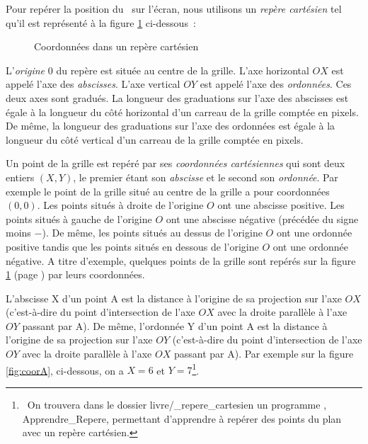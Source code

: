 Pour repérer la position du \robot\ sur l'écran, nous utilisons un {\em repère cartésien}
tel qu'il est représenté à la figure \ref{fig:repcar} ci-dessous~:

\begin{figure}[htbp]
 \caption{Coordonnées dans un repère cartésien}\label{fig:repcar}
\end{figure}

L'{\em origine\/} $0$ du repère est située au centre de la grille. L'axe horizontal $OX$ est 
appelé l'axe des {\em abscisses\/}. L'axe vertical $OY$ est 
appelé l'axe des {\em ordonnées\/}. Ces deux axes sont gradués. La longueur des
graduations sur l'axe des abscisses est égale à la longueur du côté horizontal d'un carreau 
 de la grille comptée en pixels. De même, la longueur des
graduations sur l'axe des ordonnées est égale à la longueur du côté vertical d'un carreau
de la grille comptée en pixels. 

Un point de la grille est repéré par ses {\em  coordonnées cartésiennes} qui sont
deux entiers $(X, Y)$, le premier étant son {\em abscisse} et le second son {\em ordonnée}. Par exemple le 
point de la grille situé au centre de la grille a pour coordonnées $(0, 0)$. Les points situés
à droite de l'origine $O$ ont une abscisse positive. Les points situés
à gauche de l'origine $O$ ont une abscisse négative (précédée du signe moins $-$). 
De même, les points situés au dessus
de l'origine $O$ ont une ordonnée positive tandis que les points situés
en dessous de l'origine $O$ ont une ordonnée négative.  A titre d'exemple, quelques points de 
la grille sont repérés sur la figure \ref{fig:repcar}  (page \pageref{fig:repcar}) par leurs 
coordonnées.  

L'abscisse X d'un point A est la distance à l'origine de sa projection sur l'axe $OX$
(c'est-à-dire du point d'intersection
de l'axe $OX$ avec la droite parallèle à l'axe $OY$ passant par A). De même, l'ordonnée Y d'un point 
A est la distance à l'origine de sa projection sur l'axe $OY$
(c'est-à-dire du point d'intersection
de l'axe $OY$ avec la droite parallèle à l'axe $OX$ passant par A). Par exemple sur la figure
\ref{fig:coorA}, 
ci-dessous,
on a $X = 6$ et $Y = 7$\footnote{\ On trouvera dans le dossier {\idt livre/\_repere\_cartesien}
un programme \ocaml, {\idt Apprendre\_Repere}, permettant d'apprendre à repérer des points du plan avec
un repère cartésien.}.

